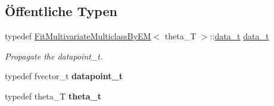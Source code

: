 \subsection*{Öffentliche Typen}
\begin{DoxyCompactItemize}
\item 
\hypertarget{classCDA_1_1EMGenericMixtureModelCore_a214d2b1e405c73983247d0e6120e02d0}{
typedef \hyperlink{classCDA_1_1FitMultivariateMulticlassByEM}{FitMultivariateMulticlassByEM}$<$ theta\_\-T $>$::\hyperlink{classCDA_1_1VectorEMData}{data\_\-t} \hyperlink{classCDA_1_1EMGenericMixtureModelCore_a214d2b1e405c73983247d0e6120e02d0}{data\_\-t}}
\label{classCDA_1_1EMGenericMixtureModelCore_a214d2b1e405c73983247d0e6120e02d0}

\begin{DoxyCompactList}\small\item\em Propagate the datapoint\_\-t. \item\end{DoxyCompactList}\item 
\hypertarget{classCDA_1_1EMGenericMixtureModelCore_ad2c2b756c2ab5fa847f790101f94bfb1}{
typedef fvector\_\-t {\bfseries datapoint\_\-t}}
\label{classCDA_1_1EMGenericMixtureModelCore_ad2c2b756c2ab5fa847f790101f94bfb1}

\item 
\hypertarget{classCDA_1_1EMGenericMixtureModelCore_a357d859efcc7e756f677f6327c287804}{
typedef theta\_\-T {\bfseries theta\_\-t}}
\label{classCDA_1_1EMGenericMixtureModelCore_a357d859efcc7e756f677f6327c287804}

\end{DoxyCompactItemize}
